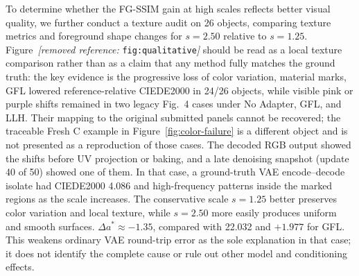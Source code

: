 \documentclass[times,twocolumn,final]{elsarticle}
\providecommand{\DIFadd}[1]{{\protect\color{blue} \sf #1}} %
\providecommand{\DIFdel}[1]{{\protect\color{red} \scriptsize #1}} %
\providecommand{\DIFaddbegin}{} %
\providecommand{\DIFaddend}{} %
\providecommand{\DIFdelbegin}{} %
\providecommand{\DIFdelend}{} %
\begin{document}
\DIFdelbegin \DIFdel{To determine whether the FG-SSIM gain at high scales reflects better visual quality, we further conduct a texture audit on 26 objects, comparing texture metrics and foreground shape changes for $s = 2.50$ relative to $s = 1.25$. Figure~\textit{[removed reference: }\texttt{fig:qualitative}\textit{]} should be read as a local texture comparison rather than as a claim that any method fully matches the ground truth: the key evidence is the progressive loss of color variation, material marks, }\DIFdelend \DIFaddbegin \DIFadd{GFL lowered reference-relative CIEDE2000 in 24/26 objects, while visible pink or purple shifts remained in two legacy Fig.~4 cases under No Adapter, GFL, and LLH. Their mapping to the original submitted panels cannot be recovered; the traceable Fresh C example in Figure~\ref{fig:color-failure} is a different object and is not presented as a reproduction of those cases. The decoded RGB output showed the shifts before UV projection or baking, and a late denoising snapshot (update 40 of 50) showed one of them. In that case, a ground-truth VAE encode--decode isolate had CIEDE2000 4.086 }\DIFaddend and \DIFdelbegin \DIFdel{high-frequency patterns inside the marked regions as the scale increases.
The conservative scale $s = 1.25$ better preserves color variation and local texture, while $s = 2.50$ more easily produces uniform and smooth surfaces. }\DIFdelend \DIFaddbegin \DIFadd{$\Delta a^*\approx-1.35$, compared with 22.032 and $+1.977$ for GFL. This weakens ordinary VAE round-trip error as the sole explanation in that case; it does not identify the complete cause or rule out other model and conditioning effects.
}\DIFaddend 

\DIFdelbegin %
\end{document}
